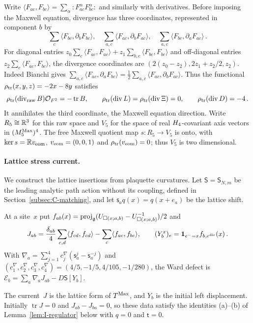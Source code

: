 Write $\langle F_{ac},F_{bc}\rangle=\sum_\alpha:F^\alpha_{ac}F^\alpha_{bc}:$ and similarly with derivatives. Before imposing the Maxwell equation, divergence has three coordinates, represented in component $b$ by
\begin{equation*}
\sum_c\langle F_{bc},\partial_bF_{bc}\rangle,\quad
\sum_{a,c}\langle F_{ac},\partial_bF_{ac}\rangle,\quad
\sum_{a,c}\langle F_{bc},\partial_aF_{ac}\rangle\,.
\end{equation*}
For diagonal entries $z_0\sum_c\langle F_{ac},F_{ac}\rangle+z_1\sum_{b,c}\langle F_{bc},F_{bc}\rangle$ and off-diagonal entries $z_2\sum_c\langle F_{ac},F_{bc}\rangle$, the divergence coordinates are $(2(z_0-z_2),2z_1+z_2/2,z_2)$. Indeed Bianchi gives $\sum_{a,c}\langle F_{ac},\partial_aF_{bc}\rangle=\frac12\sum_{a,c}\langle F_{ac},\partial_bF_{ac}\rangle$. Thus the functional $\rho_{\rm tr}(x,y,z)=-2x-8y$ satisfies
\begin{equation}\label{eq:I-rho}
\rho_{\rm tr}(\operatorname{div}_{\rm raw}B)\mathcal{O}_{F^2}=-\operatorname{tr}B,
\qquad \rho_{\rm tr}(\operatorname{div}L)=\rho_{\rm tr}(\operatorname{div}\Xi)=0,
\qquad \rho_{\rm tr}(\operatorname{div}D)=-4\,.
\end{equation}
It annihilates the third coordinate, the Maxwell equation direction. Write $R_5\cong\mathbb{R}^3$ for this raw space and $V_5$ for the space of real $H_4$-covariant axis vectors in $(M_{5}^{\mathrm{Max}})^4$. The free Maxwell quotient map $s:R_5\to V_5$ is onto, with $\ker s=\mathbb{R} v_{\rm eom}$, $v_{\rm eom}=(0,0,1)$ and $\rho_{\rm tr}(v_{\rm eom})=0$; thus $V_5$ is two dimensional.

\paragraph{Lattice stress current.}
We construct the lattice insertions from plaquette curvatures. Let $\mathsf S=\mathsf S_{N,m}$ be the leading analytic path action without its coupling, defined in Section~\ref{subsec:C-matching}, and let $\mathsf s_aq(x)=q(x+e_a)$ be the lattice shift.
\begin{definition}\label{def:I-current}
At a site~$x$ put $f_{ab}(x)=\operatorname{proj}_{\mathfrak{g}}(U_{\square(x;a,b)}-U_{\square(x;a,b)}^{-1})/2$ and
\begin{equation*}
J_{ab}=\frac{\delta_{ab}}4\sum_{c,d}\langle f_{cd},f_{cd}\rangle-\sum_c\langle f_{ac},f_{bc}\rangle,
\qquad (Y_b^x)_e=\mathbf1_{e^-=x}f_{b,e^{\rm dir}}(x)\,.
\end{equation*}
With $\nabla_a=\sum_{j=1}^4c^\nabla_j(\mathsf s_a^j-\mathsf s_a^{-j})$ and $(c^\nabla_1,c^\nabla_2,c^\nabla_3,c^\nabla_4)=(4/5,-1/5,4/105,-1/280)$, the Ward defect is $\mathcal E_b=\sum_a\nabla_aJ_{ab}-D\mathsf S[Y_b]$.
\end{definition}
The current~$J$ is the lattice form of $T^{\mathrm{Max}}$, and $Y_b$ is the initial left displacement. Initially $\operatorname{tr}J=0$ and $J_{ab}-J_{ba}=0$, so these data satisfy the identities (a)--(b) of Lemma~\ref{lem:I-regulator} below with $q=0$ and $\mathsf t=0$.

